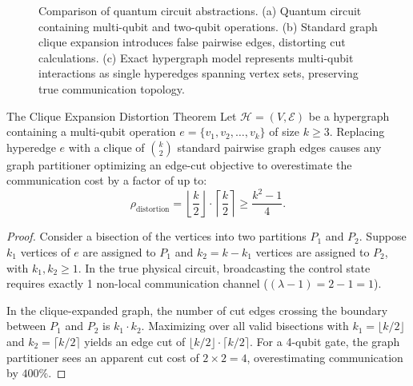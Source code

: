 \begin{figure}[htbp]
    \caption{Comparison of quantum circuit abstractions. (a) Quantum circuit containing multi-qubit and two-qubit operations. (b) Standard graph clique expansion introduces false pairwise edges, distorting cut calculations. (c) Exact hypergraph model represents multi-qubit interactions as single hyperedges spanning vertex sets, preserving true communication topology.}
    \label{fig:hypergraph_clique_distortion}
\end{figure}

\begin{theorembox}{The Clique Expansion Distortion Theorem}
Let $\mathcal{H} = (V, \mathcal{E})$ be a hypergraph containing a multi-qubit operation $e = \{v_1, v_2, \dots, v_k\}$ of size $k \ge 3$. Replacing hyperedge $e$ with a clique of $\binom{k}{2}$ standard pairwise graph edges causes any graph partitioner optimizing an edge-cut objective to overestimate the communication cost by a factor of up to:
\begin{equation}
    \rho_{\text{distortion}} = \left\lfloor \frac{k}{2} \right\rfloor \cdot \left\lceil \frac{k}{2} \right\rceil \ge \frac{k^2 - 1}{4}.
    \label{eq:clique_distortion_bound}
\end{equation}
\end{theorembox}

\begin{proof}
Consider a bisection of the vertices into two partitions $P_1$ and $P_2$. Suppose $k_1$ vertices of $e$ are assigned to $P_1$ and $k_2 = k - k_1$ vertices are assigned to $P_2$, with $k_1, k_2 \ge 1$. In the true physical circuit, broadcasting the control state requires exactly 1 non-local communication channel ($(\lambda - 1) = 2 - 1 = 1$). 

In the clique-expanded graph, the number of cut edges crossing the boundary between $P_1$ and $P_2$ is $k_1 \cdot k_2$. Maximizing over all valid bisections with $k_1 = \lfloor k/2 \rfloor$ and $k_2 = \lceil k/2 \rceil$ yields an edge cut of $\lfloor k/2 \rfloor \cdot \lceil k/2 \rceil$. For a 4-qubit gate, the graph partitioner sees an apparent cut cost of $2 \times 2 = 4$, overestimating communication by $400\%$.
\end{proof}


